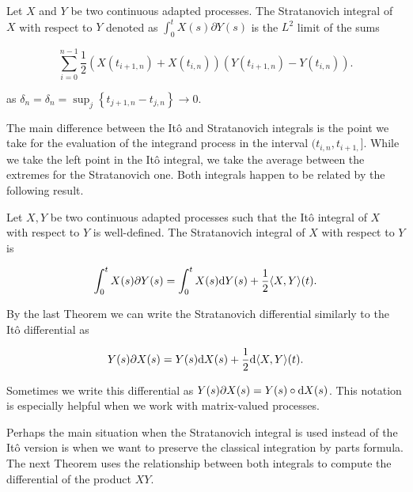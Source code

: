 \begin{definition}
    Let $X$ and $Y$ be two continuous adapted processes. The Stratanovich integral of $X$ with respect to $Y$ denoted as $\int_0^t X(s) \partial Y(s)$ is the $L^2$ limit of the sums

    \begin{equation*}
        \sum_{i=0}^{n-1} \frac12( X(t_{i+1,n}) + X(t_{i,n}))( Y(t_{i+1,n}) - Y(t_{i,n})).
    \end{equation*}

    \noindent as $\delta_n = \delta_n = \sup_j \left\{ t_{j+1,n} - t_{j,n} \right\} \to 0$.
\end{definition}

    The main difference between the Itô and Stratanovich integrals is the point we take for the evaluation of the integrand process in the interval $(t_{i,n},t_{i+1,}]$. While we take the left point in the Itô integral, we take the average between the extremes for the Stratanovich one. Both integrals happen to be related by the following result.

\begin{theorem}
    Let $X,Y$ be two continuous adapted processes such that the Itô integral of $X$ with respect to $Y$ is well-defined. The Stratanovich integral of $X$ with respect to $Y$ is 

    \begin{equation*}
        \int_0^t X(s) \partial Y(s) = \int_0^t X(s) \mathrm d Y (s) + \frac12 \langle X,Y\rangle (t).
    \end{equation*}
\end{theorem}

By the last Theorem we can write the Stratanovich differential similarly to the Itô differential as

\begin{equation*}
    Y(s) \partial X(s) = Y(s) \mathrm d X(s) + \frac12 \mathrm d \langle X,Y \rangle (t).
\end{equation*}

Sometimes we write this differential as $Y(s) \partial X(s) = Y(s) \circ \mathrm d X(s)$. This notation is especially helpful when we work with matrix-valued processes.

Perhaps the main situation when the Stratanovich integral is used instead of the Itô version is when we want to preserve the classical integration by parts formula. The next Theorem uses the relationship between both integrals to compute the differential of the product $XY$.

